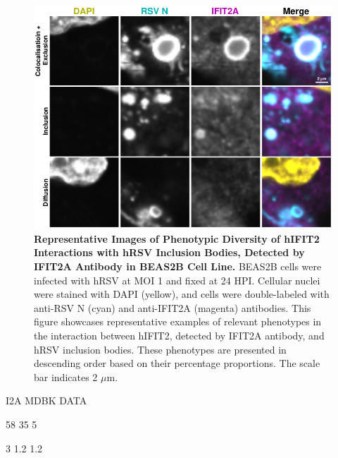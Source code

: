 \begin{figure}
    \centering
    \includegraphics[width=1\linewidth]{08. Chapter 3/Figs/02. Infection/02. IFIT2/01. IFIT2A/12. i2a beas2b.pdf} 
    \caption[Representative Images of Phenotypic Diversity of hIFIT2 Interactions with hRSV Inclusion Bodies, Detected by IFIT2A Antibody in BEAS2B Cell Line.]{\textbf{Representative Images of Phenotypic Diversity of hIFIT2 Interactions with hRSV Inclusion Bodies, Detected by IFIT2A Antibody in BEAS2B Cell Line.} BEAS2B cells were infected with hRSV at MOI 1 and fixed at 24 HPI. Cellular nuclei were stained with DAPI (yellow), and cells were double-labeled with anti-RSV N (cyan) and anti-IFIT2A (magenta) antibodies. This figure showcases representative examples of relevant phenotypes in the interaction between hIFIT2, detected by IFIT2A antibody, and hRSV inclusion bodies. These phenotypes are presented in descending order based on their percentage proportions. The scale bar indicates 2 \(\mu \mbox{m}\).}
    \label{fig:Representative Images of Phenotypic Diversity of hIFIT2 Interactions with hRSV Inclusion Bodies, Detected by IFIT2A Antibody in BEAS2B Cell Line}
\end{figure}

I2A MDBK DATA

58 35 5

3 1.2 1.2


